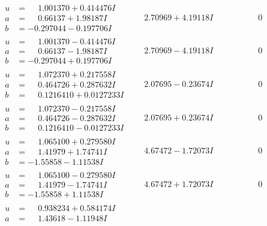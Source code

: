\documentclass[1p]{elsarticle_modified}
\theoremstyle{definition}
\begin{document}
$$\begin{array}{c|c|c}
\begin{aligned}
u &= \phantom{-}1.001370 + 0.414476 I \\
a &= \phantom{-}0.66137 + 1.98187 I \\
b &= -0.297044 - 0.197706 I\end{aligned}
 & \phantom{-}2.70969 + 4.19118 I & \phantom{-0.000000 } 0 \\ \hline\begin{aligned}
u &= \phantom{-}1.001370 - 0.414476 I \\
a &= \phantom{-}0.66137 - 1.98187 I \\
b &= -0.297044 + 0.197706 I\end{aligned}
 & \phantom{-}2.70969 - 4.19118 I & \phantom{-0.000000 } 0 \\ \hline\begin{aligned}
u &= \phantom{-}1.072370 + 0.217558 I \\
a &= \phantom{-}0.464726 + 0.287632 I \\
b &= \phantom{-}0.1216410 + 0.0127233 I\end{aligned}
 & \phantom{-}2.07695 - 0.23674 I & \phantom{-0.000000 } 0 \\ \hline\begin{aligned}
u &= \phantom{-}1.072370 - 0.217558 I \\
a &= \phantom{-}0.464726 - 0.287632 I \\
b &= \phantom{-}0.1216410 - 0.0127233 I\end{aligned}
 & \phantom{-}2.07695 + 0.23674 I & \phantom{-0.000000 } 0 \\ \hline\begin{aligned}
u &= \phantom{-}1.065100 + 0.279580 I \\
a &= \phantom{-}1.41979 + 1.74741 I \\
b &= -1.55858 - 1.11538 I\end{aligned}
 & \phantom{-}4.67472 - 1.72073 I & \phantom{-0.000000 } 0 \\ \hline\begin{aligned}
u &= \phantom{-}1.065100 - 0.279580 I \\
a &= \phantom{-}1.41979 - 1.74741 I \\
b &= -1.55858 + 1.11538 I\end{aligned}
 & \phantom{-}4.67472 + 1.72073 I & \phantom{-0.000000 } 0 \\ \hline\begin{aligned}
u &= \phantom{-}0.938234 + 0.584174 I \\
a &= \phantom{-}1.43618 - 1.11948 I \\

\end{aligned}
\end{array}$$
\end{document}

